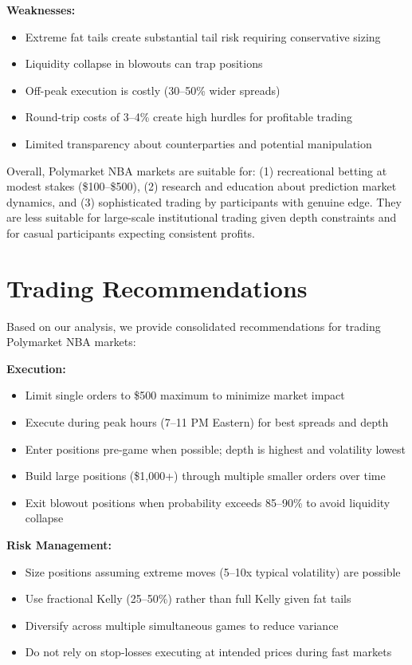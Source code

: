 \textbf{Weaknesses:}
\begin{itemize}
    \item Extreme fat tails create substantial tail risk requiring conservative sizing
    \item Liquidity collapse in blowouts can trap positions
    \item Off-peak execution is costly (30--50\% wider spreads)
    \item Round-trip costs of 3--4\% create high hurdles for profitable trading
    \item Limited transparency about counterparties and potential manipulation
\end{itemize}

Overall, Polymarket NBA markets are suitable for: (1) recreational betting at modest stakes (\$100--\$500), (2) research and education about prediction market dynamics, and (3) sophisticated trading by participants with genuine edge. They are less suitable for large-scale institutional trading given depth constraints and for casual participants expecting consistent profits.

\section{Trading Recommendations}

Based on our analysis, we provide consolidated recommendations for trading Polymarket NBA markets:

\textbf{Execution:}
\begin{itemize}
    \item Limit single orders to \$500 maximum to minimize market impact
    \item Execute during peak hours (7--11 PM Eastern) for best spreads and depth
    \item Enter positions pre-game when possible; depth is highest and volatility lowest
    \item Build large positions (\$1,000+) through multiple smaller orders over time
    \item Exit blowout positions when probability exceeds 85--90\% to avoid liquidity collapse
\end{itemize}

\textbf{Risk Management:}
\begin{itemize}
    \item Size positions assuming extreme moves (5--10x typical volatility) are possible
    \item Use fractional Kelly (25--50\%) rather than full Kelly given fat tails
    \item Diversify across multiple simultaneous games to reduce variance
    \item Do not rely on stop-losses executing at intended prices during fast markets
\end{itemize}

